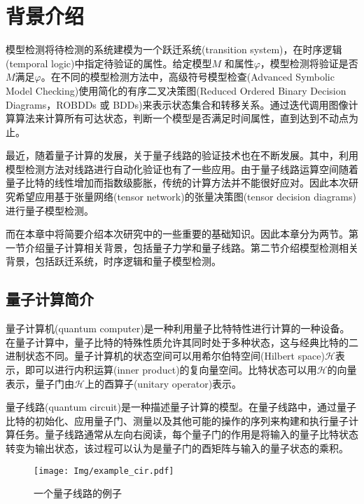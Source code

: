 \chapter{背景介绍}


模型检测将待检测的系统建模为一个跃迁系统(transition system)，在时序逻辑(temporal logic)中指定待验证的属性。给定模型\(M\) 和属性\(\varphi\)，模型检测将验证是否\(M\)满足\(\varphi\)。在不同的模型检测方法中，高级符号模型检查(Advanced Symbolic Model Checking)\citep{Grobelna_2015}使用简化的有序二叉决策图(Reduced Ordered Binary Decision Diagrams，ROBDDs 或 BDDs)\citep{Bryant_1986}来表示状态集合和转移关系。通过迭代调用图像计算算法来计算所有可达状态，判断一个模型是否满足时间属性，直到达到不动点为止。

最近，随着量子计算的发展，关于量子线路的验证技术也在不断发展\citep{viamontes2007checking,burgholzer2020advanced}。其中，利用模型检测方法对线路进行自动化验证也有了一些应用。由于量子线路运算空间随着量子比特的线性增加而指数级膨胀，传统的计算方法并不能很好应对。因此本次研究希望应用基于张量网络(tensor network)的张量决策图(tensor decision diagrams)进行量子模型检测。

而在本章中将简要介绍本次研究中的一些重要的基础知识。因此本章分为两节。第一节介绍量子计算相关背景，包括量子力学和量子线路。第二节介绍模型检测相关背景，包括跃迁系统，时序逻辑和量子模型检测。
\section{量子计算简介}
量子计算机(quantum computer)是一种利用量子比特特性进行计算的一种设备。在量子计算中，量子比特的特殊性质允许其同时处于多种状态，这与经典比特的二进制状态不同。量子计算机的状态空间可以用希尔伯特空间(Hilbert space)\(\mathcal{H}\)表示\citep{nielsen2010quantum}，即可以进行内积运算(inner product)的复向量空间。比特状态可以用\(\mathcal{H}\)的向量表示，量子门由\(\mathcal{H}\)上的酉算子(unitary operator)表示。

量子线路(quantum circuit)是一种描述量子计算的模型。在量子线路中，通过量子比特的初始化、应用量子门、测量以及其他可能的操作的序列来构建和执行量子计算任务。量子线路通常从左向右阅读，每个量子门的作用是将输入的量子比特状态转变为输出状态，该过程可以认为是量子门的酉矩阵与输入的量子状态的乘积。
\begin{figure}[!htbp]
    \centering
    \texttt{[image: Img/example\_cir.pdf]}
    \caption{一个量子线路的例子}
    \label{fig:example_cir}
\end{figure}

